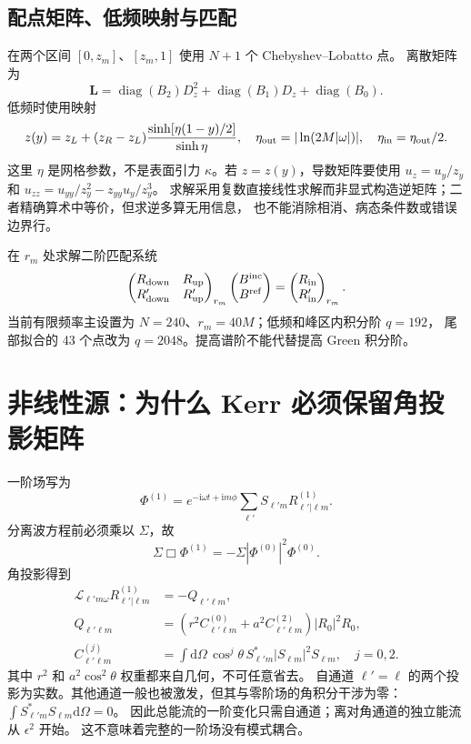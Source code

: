 \documentclass[UTF8,fontset=fandol,11pt,a4paper]{ctexart}
\newcommand{\ii}{\mathrm{i}}
\newcommand{\dd}{\mathrm{d}}
\newcommand{\Bin}{B^{\mathrm{inc}}}
\newcommand{\Bref}{B^{\mathrm{ref}}}
\numberwithin{equation}{section}
\begin{document}
\subsection{配点矩阵、低频映射与匹配}
在两个区间 $[0,z_m]$、$[z_m,1]$ 使用 $N+1$ 个 Chebyshev--Lobatto 点。
离散矩阵为
\begin{equation}
\bm L=\operatorname{diag}(B_2)D_z^2+
\operatorname{diag}(B_1)D_z+\operatorname{diag}(B_0).
\end{equation}
低频时使用映射
\begin{equation}
z(y)=z_L+(z_R-z_L)\frac{\sinh[\eta(1-y)/2]}{\sinh\eta},\quad
\eta_{\rm out}=|\ln(2M|\omega|)|,\quad\eta_{\rm in}=\eta_{\rm out}/2.
\end{equation}
这里 $\eta$ 是网格参数，不是表面引力 $\kappa$。若 $z=z(y)$，导数矩阵要使用
$u_z=u_y/z_y$ 和 $u_{zz}=u_{yy}/z_y^2-z_{yy}u_y/z_y^3$。
求解采用复数直接线性求解而非显式构造逆矩阵；二者精确算术中等价，但求逆多算无用信息，
也不能消除相消、病态条件数或错误边界行。

在 $r_m$ 处求解二阶匹配系统
\begin{equation}
\begin{pmatrix}R_{\rm down}&R_{\rm up}\\R'_{\rm down}&R'_{\rm up}\end{pmatrix}_{r_m}
\begin{pmatrix}\Bin\\\Bref\end{pmatrix}
=\begin{pmatrix}R_{\rm in}\\R'_{\rm in}\end{pmatrix}_{r_m}.
\end{equation}
当前有限频率主设置为 $N=240$、$r_m=40M$；低频和峰区内积分阶 $q=192$，
尾部拟合的 43 个点改为 $q=2048$。提高谱阶不能代替提高 Green 积分阶。

\section{非线性源：为什么 Kerr 必须保留角投影矩阵}
一阶场写为
\begin{equation}
\Phi^{(1)}=e^{-\ii\omega t+\ii m\phi}\sum_{\ell'}S_{\ell'm}R^{(1)}_{\ell'|\ell m}.
\end{equation}
分离波方程前必须乘以 $\Sigma$，故
\begin{equation}
\Sigma\Box\Phi^{(1)}=-\Sigma|\Phi^{(0)}|^2\Phi^{(0)}.
\end{equation}
角投影得到
\begin{align}
\mathcal L_{\ell'm\omega}R^{(1)}_{\ell'|\ell m}&=-Q_{\ell'\ell m},\\
Q_{\ell'\ell m}&=(r^2 C^{(0)}_{\ell'\ell m}+a^2 C^{(2)}_{\ell'\ell m})|R_0|^2R_0,\\
C^{(j)}_{\ell'\ell m}&=\int\dd\Omega\,\cos^j\theta\,S_{\ell'm}^*|S_{\ell m}|^2S_{\ell m},\quad j=0,2.
\end{align}
其中 $r^2$ 和 $a^2\cos^2\theta$ 权重都来自几何，不可任意省去。
自通道 $\ell'=\ell$ 的两个投影为实数。其他通道一般也被激发，但其与零阶场的角积分干涉为零：
$\int S_{\ell'm}^*S_{\ell m}\dd\Omega=0$。
因此总能流的一阶变化只需自通道；离对角通道的独立能流从 $\epsilon^2$ 开始。
这不意味着完整的一阶场没有模式耦合。
\end{document}
